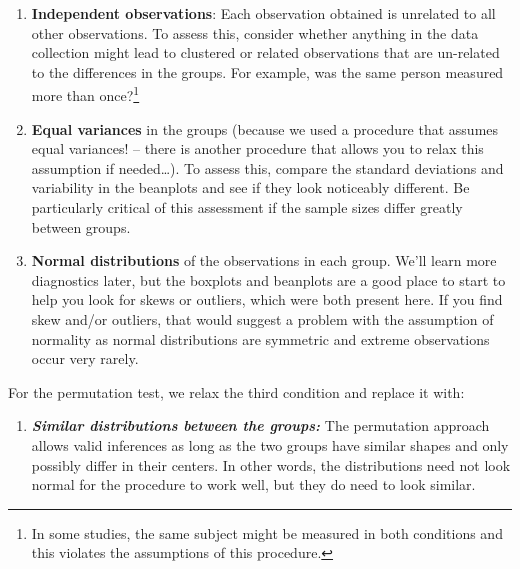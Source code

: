 \documentclass[]{book}
\providecommand{\tightlist}{%
  \setlength{\itemsep}{0pt}\setlength{\parskip}{0pt}}
\let\rmarkdownfootnote\footnote%
\def\footnote{\protect\rmarkdownfootnote}
\begin{document}
\begin{enumerate}
\def\labelenumi{\arabic{enumi}.}
\item
  \textbf{Independent observations}: Each observation obtained is
  unrelated to all other observations. To assess this, consider whether
  anything in the data collection might lead to clustered or related
  observations that are un-related to the differences in the groups. For
  example, was the same person measured more than once?\footnote{In some
    studies, the same subject might be measured in both conditions and
    this violates the assumptions of this procedure.}
\item
  \textbf{Equal variances} in the groups (because we used a procedure
  that assumes equal variances! -- there is another procedure that
  allows you to relax this assumption if needed\ldots{}). To assess
  this, compare the standard deviations and variability in the beanplots
  and see if they look noticeably different. Be particularly critical of
  this assessment if the sample sizes differ greatly between groups.
\item
  \textbf{Normal distributions} of the observations in each group. We'll
  learn more diagnostics later, but the boxplots and beanplots are a
  good place to start to help you look for skews or outliers, which were
  both present here. If you find skew and/or outliers, that would
  suggest a problem with the assumption of normality as normal
  distributions are symmetric and extreme observations occur very
  rarely.
\end{enumerate}

For the permutation test, we relax the third condition and replace it
with:

\begin{enumerate}
\def\labelenumi{\arabic{enumi}.}
\setcounter{enumi}{2}
\tightlist
\item
  \textbf{\emph{Similar distributions between the groups:}} The
  permutation approach allows valid inferences as long as the two groups
  have similar shapes and only possibly differ in their centers. In
  other words, the distributions need not look normal for the procedure
  to work well, but they do need to look similar.
\end{enumerate}
\end{document}
